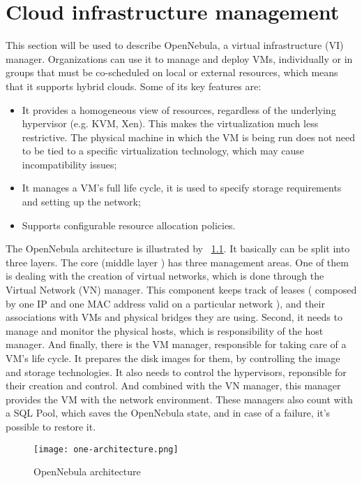 \chapter{\textbf{Cloud infrastructure management}}


This section will be used to describe OpenNebula, a virtual infrastructure (VI) manager. Organizations can use it to manage and deploy VMs, individually or in groups that must be co-scheduled on local or external resources, which means that it supports hybrid clouds. Some of its key features are:
\begin{itemize}
 \item It provides a homogeneous view of resources, regardless of the underlying hypervisor (e.g. KVM, Xen). This makes the virtualization much less restrictive. The physical machine in which the VM is being run does not need to be tied to a specific virtualization technology, which may cause incompatibility issues;
  \item It manages a VM's full life cycle, it is used to specify storage requirements and setting up the network;
  \item Supports configurable resource allocation policies.
\end{itemize}

The OpenNebula architecture is illustrated by ~\ref{fig:open_arch}. It basically can be split into three layers. The core (middle layer ) has three management areas. One of them is dealing with the creation of virtual networks, which is done through the Virtual Network (VN) manager. This component keeps track of leases ( composed by one IP and one MAC address valid on a particular network ), and their associations with VMs and physical bridges they are using. Second, it needs to manage and monitor the physical hosts, which is responsibility of the host manager. And finally, there is the VM manager, responsible for taking care of a VM's life cycle. It prepares the disk images for them, by controlling the image and storage technologies. It also needs to control the hypervisors, reponsible for their creation and control. And combined with the VN manager, this manager provides the VM with the network environment. These managers also count with a SQL Pool, which saves the OpenNebula state, and in case of a failure, it's possible to restore it.

\begin{figure}[ht]
  \centering
 \texttt{[image: one-architecture.png]}
  \caption{OpenNebula architecture}
  \label{fig:open_arch}
\end{figure}

